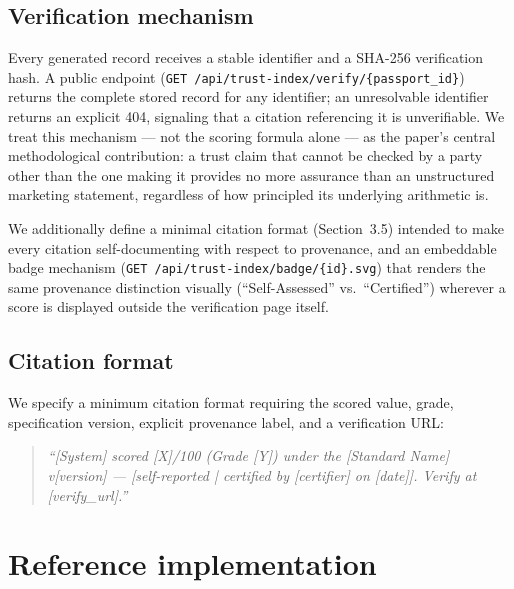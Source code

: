 \documentclass[11pt]{article}
\begin{document}
\subsection{Verification mechanism}

Every generated record receives a stable identifier and a SHA-256
verification hash. A public endpoint
(\texttt{GET /api/trust-index/verify/\{passport\_id\}}) returns the
complete stored record for any identifier; an unresolvable identifier
returns an explicit 404, signaling that a citation referencing it is
unverifiable. We treat this mechanism --- not the scoring formula
alone --- as the paper's central methodological contribution: a trust
claim that cannot be checked by a party other than the one making it
provides no more assurance than an unstructured marketing statement,
regardless of how principled its underlying arithmetic is.

We additionally define a minimal citation format (Section~3.5)
intended to make every citation self-documenting with respect to
provenance, and an embeddable badge mechanism
(\texttt{GET /api/trust-index/badge/\{id\}.svg}) that renders the same
provenance distinction visually (``Self-Assessed'' vs.\ ``Certified'')
wherever a score is displayed outside the verification page itself.

\subsection{Citation format}

We specify a minimum citation format requiring the scored value,
grade, specification version, explicit provenance label, and a
verification URL:

\begin{quote}
\emph{``[System] scored [X]/100 (Grade [Y]) under the [Standard Name]
v[version] --- [self-reported | certified by [certifier] on [date]].
Verify at [verify\_url].''}
\end{quote}

\section{Reference implementation}
\end{document}
